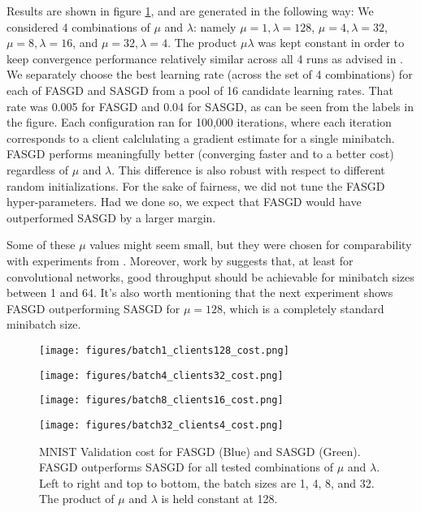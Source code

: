 \documentclass{article} %
\begin{document}
Results are shown in figure \ref{costfig}, and are generated in the following way:
We considered 4 combinations of $\mu$ and $\lambda$: namely $\mu=1, \lambda=128$, 
$\mu=4, \lambda=32$, $\mu=8, \lambda=16$, and $\mu=32, \lambda=4$.
The product $\mu \lambda$ was kept constant in order to keep convergence performance
relatively similar across all 4 runs as advised in \cite{Tradeoffs}.
We separately choose the best learning rate (across the set of 4 combinations)
for each of FASGD and SASGD from a pool of 16 candidate learning rates.
That rate was 0.005 for FASGD and 0.04 for SASGD, as can be seen from the labels in the figure.
Each configuration ran for 100,000 iterations, 
where each iteration corresponds to a client calclulating
a gradient estimate for a single minibatch.
FASGD performs meaningfully better (converging faster and to a better cost)
regardless of $\mu$ and $\lambda$.
This difference is also robust with respect to different random
initializations.
For the sake of fairness, we did not tune the FASGD hyper-parameters.
Had we done so, we expect that FASGD would have outperformed SASGD by
a larger margin.

Some of these $\mu$ values might seem small, but they were chosen for comparability
with experiments from \cite{Suyog}. Moreover, work by \cite{winograd} suggests that, at least
for convolutional networks, good throughput should be achievable for minibatch sizes between
1 and 64. It's also worth mentioning that the next experiment shows FASGD outperforming SASGD for $\mu = 128$,
which is a completely standard minibatch size.

\begin{figure}[ht!]
  \centering
  \begin{minipage}[b]{0.5\linewidth}
    \texttt{[image: figures/batch1\_clients128\_cost.png]}
  \end{minipage}%
  \begin{minipage}[b]{0.5\linewidth}
    \texttt{[image: figures/batch4\_clients32\_cost.png]}
  \end{minipage} 
  \begin{minipage}[b]{0.5\linewidth}
    \texttt{[image: figures/batch8\_clients16\_cost.png]}
  \end{minipage}%
  \begin{minipage}[b]{0.5\linewidth}
    \texttt{[image: figures/batch32\_clients4\_cost.png]}
  \end{minipage}%
  \caption{MNIST Validation cost for FASGD (Blue) and SASGD (Green).
  FASGD outperforms SASGD for all tested combinations of $\mu$ and $\lambda$. 
  Left to right and top to bottom, the batch sizes are 1, 4, 8, and 32.
  The product of $\mu$ and $\lambda$ is held constant at 128.
  }
  \label{costfig} 
\end{figure}
\end{document}
